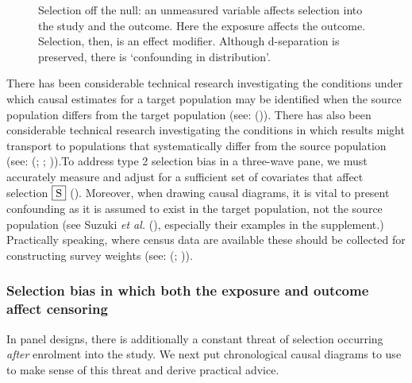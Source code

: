 \documentclass[
  singlecolumn]{article}
\begin{document}
\begin{figure}


\caption{\label{fig-selection-off-the-null}Selection off the null: an
unmeasured variable affects selection into the study and the outcome.
Here the exposure affects the outcome. Selection, then, is an effect
modifier. Although d-separation is preserved, there is `confounding in
distribution'.}

\end{figure}%

There has been considerable technical research investigating the
conditions under which causal estimates for a target population may be
identified when the source population differs from the target population
(see: ()). There has also
been considerable technical research investigating the conditions in
which results might transport to populations that systematically differ
from the source population (see:
(;
;
)).To address type 2
selection bias in a three-wave pane, we must accurately measure and
adjust for a sufficient set of covariates that affect selection
\(\framebox{S}\) ().
Moreover, when drawing causal diagrams, it is vital to present
confounding as it is assumed to exist in the target population, not the
source population (see Suzuki \emph{et al.}
(), especially their examples in the
supplement.) Practically speaking, where census data are available these
should be collected for constructing survey weights (see:
(;
)).

\subsubsection{Selection bias in which both the exposure and outcome
affect
censoring}\label{selection-bias-in-which-both-the-exposure-and-outcome-affect-censoring}

In panel designs, there is additionally a constant threat of selection
occurring \emph{after} enrolment into the study. We next put
chronological causal diagrams to use to make sense of this threat and
derive practical advice.
\end{document}
